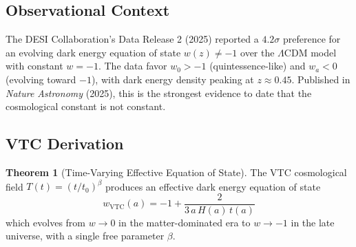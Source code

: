 \documentclass[11pt,a4paper]{article}
\theoremstyle{definition}
\newtheorem{theorem}{Theorem}[section]
\newcommand{\VTC}{\mathrm{VTC}}
\begin{document}
\subsection{Observational Context}

The DESI Collaboration's Data Release 2 (2025) reported a $4.2\sigma$ preference for an evolving dark energy equation of state $w(z) \neq -1$ over the $\Lambda$CDM model with constant $w = -1$. The data favor $w_0 > -1$ (quintessence-like) and $w_a < 0$ (evolving toward $-1$), with dark energy density peaking at $z \approx 0.45$. Published in \textit{Nature Astronomy} (2025), this is the strongest evidence to date that the cosmological constant is not constant.

\subsection{VTC Derivation}

\begin{theorem}[Time-Varying Effective Equation of State]
\label{thm:p3}
The VTC cosmological field $T(t) = (t/t_0)^\beta$ produces an effective dark energy equation of state
\begin{equation}
w_\VTC(a) = -1 + \frac{2}{3\,a\,H(a)\,t(a)}
\end{equation}
which evolves from $w \to 0$ in the matter-dominated era to $w \to -1$ in the late universe, with a single free parameter $\beta$.
\end{theorem}
\end{document}
